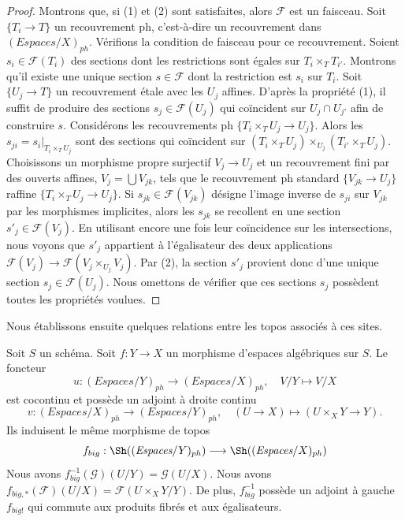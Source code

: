 \begin{proof}
Montrons que, si (1) et (2) sont satisfaites, alors $\mathcal{F}$ est un faisceau.
Soit $\{T_i \to T\}$ un recouvrement ph, c'est-à-dire un recouvrement dans
$(\textit{Espaces}/X)_{ph}$.
Vérifions la condition de faisceau pour ce recouvrement.
Soient $s_i \in \mathcal{F}(T_i)$ des sections dont les restrictions sont égales
sur $T_i \times_T T_{i'}$. Montrons qu'il existe une
unique section $s \in \mathcal{F}$ dont la restriction est $s_i$ sur $T_i$.
Soit $\{U_j \to T\}$ un recouvrement \'etale avec les $U_j$ affines.
D'après la propriété (1), il suffit de produire des sections $s_j \in \mathcal{F}(U_j)$
qui coïncident sur $U_j \cap U_{j'}$ afin de construire $s$.
Considérons les recouvrements ph $\{T_i \times_T U_j \to U_j\}$.
Alors les $s_{ji} = s_i|_{T_i \times_T U_j}$ sont des sections qui coïncident
sur $(T_i \times_T U_j) \times_{U_j} (T_{i'} \times_T U_j)$.
Choisissons un morphisme propre surjectif $V_j \to U_j$ et un recouvrement
fini par des ouverts affines, $V_j = \bigcup V_{jk}$, tels que le recouvrement ph standard
$\{V_{jk} \to U_j\}$ raffine $\{T_i \times_T U_j \to U_j\}$.
Si $s_{jk} \in \mathcal{F}(V_{jk})$
désigne l'image inverse de $s_{ji}$ sur $V_{jk}$ par les
morphismes implicites, alors les $s_{jk}$ se recollent en une section
$s'_j \in \mathcal{F}(V_j)$. En utilisant encore une fois leur coïncidence sur les intersections,
nous voyons que $s'_j$ appartient à l'égalisateur des deux
applications $\mathcal{F}(V_j) \to \mathcal{F}(V_j \times_{U_j} V_j)$.
Par (2), la section $s'_j$ provient donc d'une unique section
$s_j \in \mathcal{F}(U_j)$. Nous omettons de vérifier que ces
sections $s_j$ possèdent toutes les propriétés voulues.
\end{proof}

\noindent
Nous établissons ensuite quelques relations entre les topos
associés à ces sites.

\begin{lemma}
\label{lemma-morphism-big-ph}
Soit $S$ un schéma.
Soit $f : Y \to X$ un morphisme d'espaces algébriques sur $S$.
Le foncteur
$$
u : (\textit{Espaces}/Y)_{ph} \longrightarrow (\textit{Espaces}/X)_{ph},
\quad
V/Y \longmapsto V/X
$$
est cocontinu et possède un adjoint à droite continu
$$
v : (\textit{Espaces}/X)_{ph} \longrightarrow (\textit{Espaces}/Y)_{ph},
\quad
(U \to X) \longmapsto (U \times_X Y \to Y).
$$
Ils induisent le même morphisme de topos
$$
f_{big} :
\Sh((\textit{Espaces}/Y)_{ph})
\longrightarrow
\Sh((\textit{Espaces}/X)_{ph})
$$
Nous avons $f_{big}^{-1}(\mathcal{G})(U/Y) = \mathcal{G}(U/X)$.
Nous avons $f_{big, *}(\mathcal{F})(U/X) = \mathcal{F}(U \times_X Y/Y)$.
De plus, $f_{big}^{-1}$ possède un adjoint à gauche $f_{big!}$ qui commute aux
produits fibrés et aux égalisateurs.
\end{lemma}

